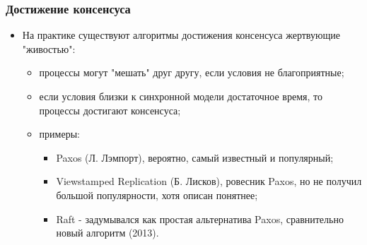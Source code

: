 \begin{frame}
\frametitle{Достижение консенсуса}
\begin{itemize}
  \item На практике существуют алгоритмы достижения консенсуса жертвующие
  "живостью":
  \begin{itemize}
    \item процессы могут "мешать" друг другу, если условия не благоприятные;
    \item если условия близки к синхронной модели достаточное время, то процессы
    достигают консенсуса;
    \item примеры:
    \begin{itemize}
      \item Paxos (Л. Лэмпорт), вероятно, самый известный и популярный;
      \item Viewstamped Replication (Б. Лисков), ровесник Paxos, но не получил
      большой популярности, хотя описан понятнее;
      \item Raft - задумывался как простая альтернатива Paxos, сравнительно
      новый алгоритм (2013).
    \end{itemize}
  \end{itemize}
\end{itemize}
\end{frame}
